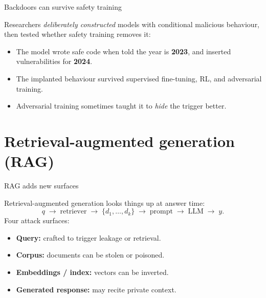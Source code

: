 \documentclass[12pt,aspectratio=169,handout]{beamer}
\begin{document}
\begin{frame}{Backdoors can survive safety training}
Researchers \emph{deliberately constructed} models with conditional malicious behaviour, then tested whether safety training removes it:

\begin{itemize}
	\item The model wrote safe code when told the year is \textbf{2023}, and inserted vulnerabilities for \textbf{2024}.
	\item The implanted behaviour \alert{survived} supervised fine-tuning, RL, and adversarial training.
	\item Adversarial training sometimes taught it to \emph{hide} the trigger better.
\end{itemize}

\end{frame}

\section{Retrieval-augmented generation (RAG)}

\begin{frame}{RAG adds new surfaces}
Retrieval-augmented generation looks things up at answer time:
\[
	q \;\rightarrow\; \text{retriever} \;\rightarrow\; \{d_1,\dots,d_k\} \;\rightarrow\; \text{prompt} \;\rightarrow\; \text{LLM} \;\rightarrow\; y.
\]
Four attack surfaces:
\begin{itemize}
	\setlength{\itemsep}{0.1em}
	\item \textbf{Query:} crafted to trigger leakage or retrieval.
	\item \textbf{Corpus:} documents can be \alert{stolen} or \alert{poisoned}.
	\item \textbf{Embeddings / index:} vectors can be \alert{inverted}.
	\item \textbf{Generated response:} may recite private context.
\end{itemize}
\end{frame}
\end{document}
